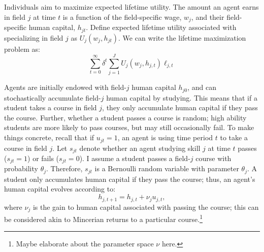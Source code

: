 \documentclass[10 pt]{article}
\newcommand{\toedit}[1]{{\color{gray}#1}}
\newcommand{\toedit}[1]{#1}
\begin{document}
Individuals aim to maximize expected lifetime utility.
The amount an agent earns in field $j$ at time $t$ is a function of the field-specific wage, $w_j$, and their field-specific human capital, $h_{jt}$.
Define expected lifetime utility associated with specializing in field $j$ as $U_j (w_j, h_{jt})$.
We can write the lifetime maximization problem as:
\begin{equation}\label{max_utility}
    \sum_{t=0}^\infty \delta^t \sum_{j=1}^J U_{j} (w_j, h_{j, t}) \ell_{j, t}
\end{equation}

Agents are initially endowed with field-$j$ human capital $h_{j0}$, and can stochastically accumulate field-$j$ human capital by studying.
\toedit{This means that} if a student takes a course in field $j$, they only accumulate human capital if they pass the course.
Further, whether a student passes a course is random; high ability students are more likely to pass courses, but may still occasionally fail. 
To make things concrete, recall that if $u_{jt}=1$, an agent is using time period $t$ to take a course in field $j$. 
Let $s_{jt}$ denote whether an agent studying skill $j$ at time $t$ passes ($s_{jt} = 1$) or fails ($s_{jt} = 0$).
I assume a student passes a field-$j$ course with probability $\theta_j$. 
Therefore, $s_{jt}$ is a Bernoulli random variable with parameter $\theta_j$.
A student only accumulates human capital if they pass the course; thus, an agent's human capital evolves according to:
\begin{equation*}
    h_{j,t+1} = h_{j,t} + \nu_j u_{j,t},
\end{equation*}
where $\nu_j$ is the gain to human capital associated with passing the course; \toedit{this can be considered akin to Mincerian returns to a particular course}.\footnote{\toedit{Maybe elaborate about the parameter space $\nu$ here.}}
\end{document}
